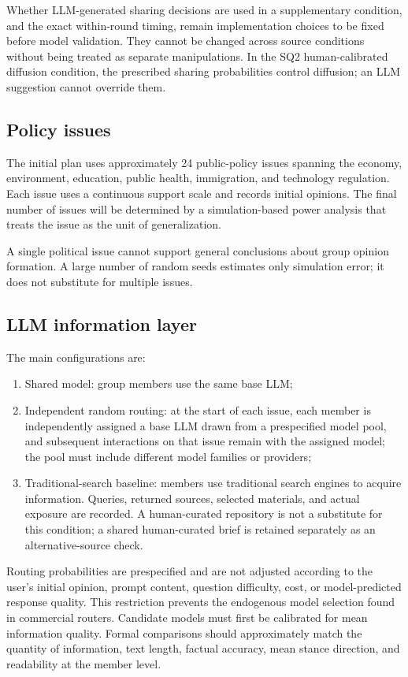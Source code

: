 \documentclass[11pt,a4paper]{article}
\begin{document}
Whether LLM-generated sharing decisions are used in a supplementary condition, and the exact within-round timing, remain implementation choices to be fixed before model validation. They cannot be changed across source conditions without being treated as separate manipulations. In the SQ2 human-calibrated diffusion condition, the prescribed sharing probabilities control diffusion; an LLM suggestion cannot override them.

\subsection{Policy issues}

The initial plan uses approximately 24 public-policy issues spanning the economy, environment, education, public health, immigration, and technology regulation. Each issue uses a continuous support scale and records initial opinions. The final number of issues will be determined by a simulation-based power analysis that treats the issue as the unit of generalization.

A single political issue cannot support general conclusions about group opinion formation. A large number of random seeds estimates only simulation error; it does not substitute for multiple issues.

\subsection{LLM information layer}

The main configurations are:

\begin{enumerate}
\item Shared model: group members use the same base LLM;
\item Independent random routing: at the start of each issue, each member is independently assigned a base LLM drawn from a prespecified model pool, and subsequent interactions on that issue remain with the assigned model; the pool must include different model families or providers;
\item Traditional-search baseline: members use traditional search engines to acquire information. Queries, returned sources, selected materials, and actual exposure are recorded. A human-curated repository is not a substitute for this condition; a shared human-curated brief is retained separately as an alternative-source check.
\end{enumerate}

Routing probabilities are prespecified and are not adjusted according to the user's initial opinion, prompt content, question difficulty, cost, or model-predicted response quality. This restriction prevents the endogenous model selection found in commercial routers. Candidate models must first be calibrated for mean information quality. Formal comparisons should approximately match the quantity of information, text length, factual accuracy, mean stance direction, and readability at the member level.
\end{document}
